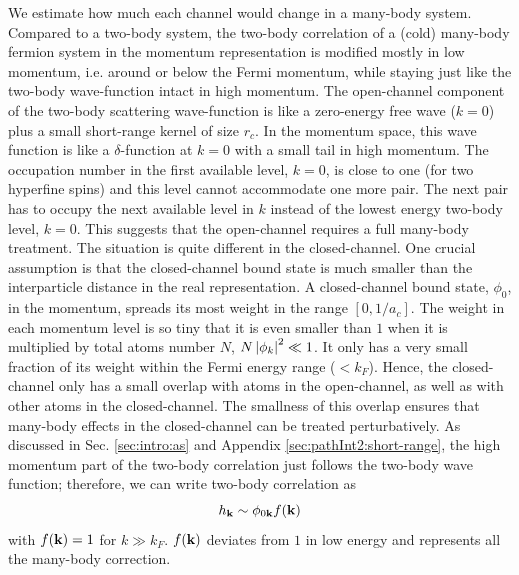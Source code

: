 We estimate how much each channel would change  in a many-body system.  Compared to a two-body system, the two-body correlation of a (cold) many-body fermion system in the momentum representation is modified mostly in  low momentum, i.e.  around or below the Fermi momentum, while staying  just like  the two-body wave-function intact in high momentum.  The open-channel component  of the two-body scattering wave-function is like a zero-energy free wave ($k=0$) plus a small short-range kernel of size $r_c$.  In the momentum space, this wave function is like a $\delta$-function at $k=0$ with a small  tail in high momentum.  The occupation number in the first available level, $k=0$, is close to one (for two hyperfine spins) and this level cannot accommodate one more pair.  The next pair has to occupy the next available level in $k$ instead of the lowest energy two-body level, $k=0$.  This suggests that the open-channel requires a full many-body treatment.  The situation is quite different in the closed-channel.   One crucial assumption is that  the closed-channel bound state is much smaller than the interparticle distance in the real representation. A closed-channel bound state,  $\phi_{0}$, in  the  momentum,  spreads its most weight  in the range $[0,1/a_{c}]$.  The weight in each momentum level is so tiny that it is even smaller than $1$ when it is multiplied by total atoms number $N$, $N\left\lvert{\phi_{k}}\right\rvert^{2}\ll1$.             It only has a very small fraction of its weight within the Fermi energy range ($<k_{F}$).  Hence, the closed-channel only has a small  overlap with atoms in  the open-channel, as well as with other atoms in the closed-channel.  The smallness of this overlap ensures that many-body effects in the closed-channel can be  treated perturbatively.  As discussed in Sec. \ref{sec:intro:as} and Appendix \ref{sec:pathInt2:short-range}, the high momentum part of the two-body correlation just follows the two-body wave function;  therefore, we can write two-body correlation as 
\begin{equation}\label{eq:pathInt2:hphif}
h_{\mathbf{k}}\sim\phi_{0\mathbf{k}}f(\mathbf{k})
\end{equation}
 with $f(\mathbf{k})=1$ for $k\gg{k_{F}}$.  $f(\mathbf{k})$ deviates from $1$ in low energy and represents all the many-body correction. 

